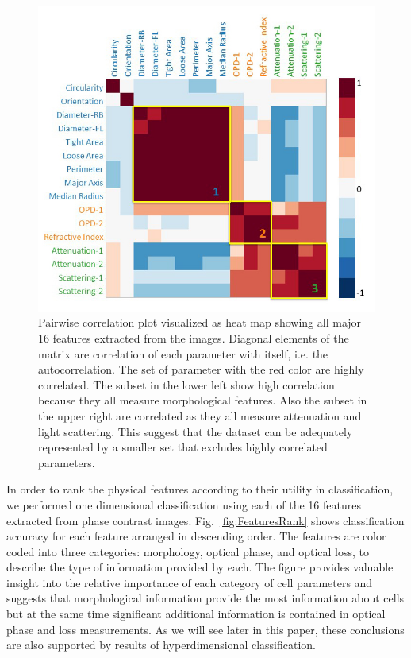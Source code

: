 \documentclass[aps,pra,reprint,superscriptaddress]{revtex4-1}
\begin{document}
\begin{figure}
\includegraphics[scale=0.6]{FigureCorrelation.jpg}
\caption{\label{fig:Correlation} Pairwise correlation plot visualized as heat map showing all major 16 features extracted from the images. Diagonal elements of the matrix are correlation of each parameter with itself, i.e. the autocorrelation. The set of parameter with the red color are highly correlated. The subset in the lower left show high correlation because they all measure morphological features. Also the subset in the upper right are correlated as they all measure attenuation and light scattering. This suggest that the dataset can be adequately represented by a smaller set that excludes highly correlated parameters. }
\end{figure}

In order to rank the physical features according to their utility in classification, we performed one dimensional classification using each of the 16 features extracted from phase contrast images. Fig.~\ref{fig:FeaturesRank} shows classification accuracy for each feature arranged in descending order. The features are color coded into three categories: morphology, optical phase, and optical loss, to describe the type of information provided by each. The figure provides valuable insight into the relative importance of each category of cell parameters and suggests that morphological information provide the most information about cells but at the same time significant additional information is contained in optical phase and loss measurements. As we will see later in this paper, these conclusions are also supported by results of hyperdimensional classification.
\end{document}
